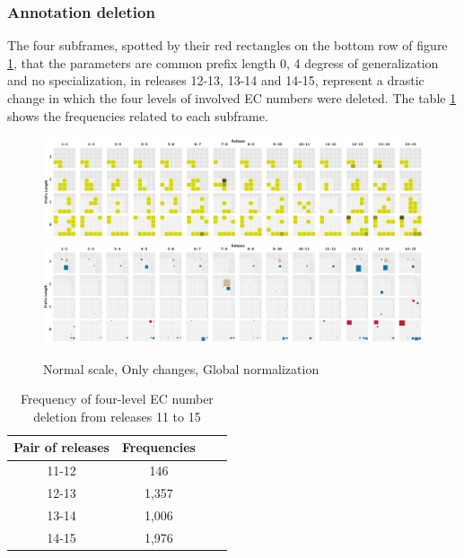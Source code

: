 \subsubsection{Annotation deletion}

The four subframes, spotted by their red rectangles on the bottom row of figure \ref{fig:heatmap001}, that the parameters are common prefix length 0, 4 degress of generalization and no specialization, in releases 12-13, 13-14 and 14-15, represent a drastic change in which the four levels of involved EC numbers were deleted. The table \ref{four_deletion} shows the frequencies related to each subframe.

\begin{figure}[htb]
  \centering
  \includegraphics[width=17cm]{images/heatmap001.png}  
  \includegraphics[width=17cm]{images/squaremap001.png}
  \caption{Normal scale, Only changes, Global normalization}
  \label{fig:heatmap001}
\end{figure}

\begin{table}[!h]
  \caption{Frequency of four-level EC number deletion from releases 11 to 15}
  \label{four_deletion}
  \scriptsize
  \begin{center}
    \begin{tabular}{cccc}
      Pair of releases & Frequencies\\
    \hline
      11-12 & 146\\
      12-13 &  1,357\\
      13-14 & 1,006\\
      14-15 & 1,976
    \end{tabular}
  \end{center}
\end{table}

